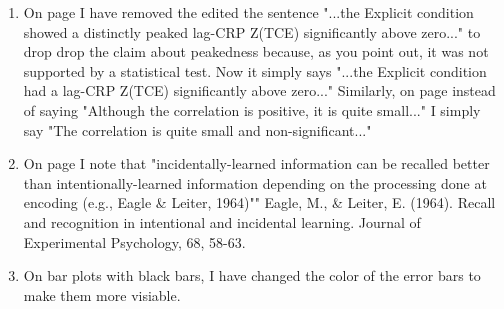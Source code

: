 \documentclass[12pt]{article}
\begin{document}
\begin{enumerate}
\item
	On page \pageref{done-11} I have removed the edited the sentence "...the Explicit condition showed a distinctly peaked lag-CRP Z(TCE) significantly above zero..." to drop drop the claim about peakedness because, as you point out, it was not supported by a statistical test. Now it simply says "...the Explicit condition had a lag-CRP Z(TCE) significantly above zero..."
	Similarly, on page \pageref{done-12} instead of saying "Although the correlation is positive, it is quite small..." I simply say "The correlation is quite small and non-significant..."

\item
	On page \pageref{TODO-13} I note that "incidentally-learned information can be recalled better than intentionally-learned information depending on the processing done at encoding (e.g., Eagle \& Leiter, 1964)""
	Eagle, M., \& Leiter, E. (1964). Recall and recognition in intentional and incidental learning. Journal of Experimental Psychology, 68, 58-63.

\item
	\pageref{TODO-14} On bar plots with black bars, I have changed the color of the error bars to make them more visiable. 


\end{enumerate}
\end{document}
